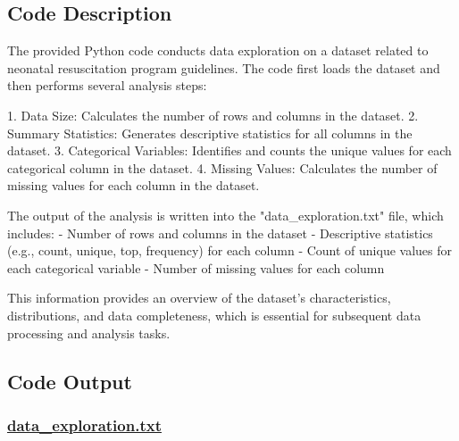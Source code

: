 \documentclass[11pt]{article}
\begin{document}
\subsection{Code Description}

The provided Python code conducts data exploration on a dataset related to neonatal resuscitation program guidelines. 
The code first loads the dataset and then performs several analysis steps:

1. Data Size: Calculates the number of rows and columns in the dataset.
2. Summary Statistics: Generates descriptive statistics for all columns in the dataset.
3. Categorical Variables: Identifies and counts the unique values for each categorical column in the dataset.
4. Missing Values: Calculates the number of missing values for each column in the dataset.

The output of the analysis is written into the "data\_exploration.txt" file, which includes:
- Number of rows and columns in the dataset
- Descriptive statistics (e.g., count, unique, top, frequency) for each column
- Count of unique values for each categorical variable
- Number of missing values for each column

This information provides an overview of the dataset's characteristics, distributions, and data completeness, which is essential for subsequent data processing and analysis tasks.

\subsection{Code Output}\hypertarget{file-data-exploration-txt}{}

\subsubsection*{\hyperlink{code-Data Exploration-data-exploration-txt}{data\_exploration.txt}}
\end{document}
